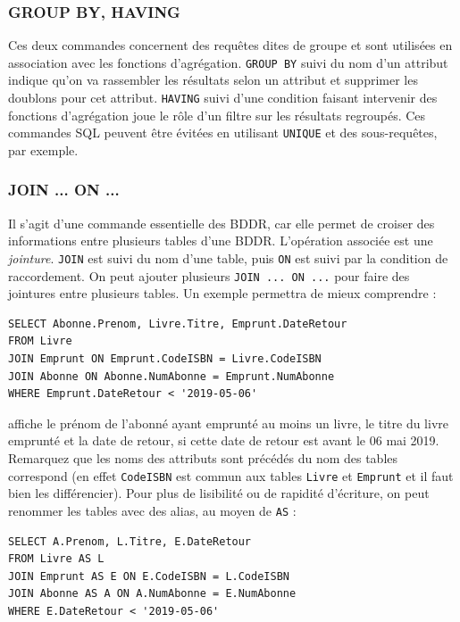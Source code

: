 \documentclass[french,11pt,twoside]{VcCours}
\begin{document}
\subsubsection*{GROUP BY, HAVING}

Ces deux commandes concernent des requêtes dites de groupe et sont utilisées en association avec les fonctions d'agrégation. \verb'GROUP BY' suivi du nom d'un attribut indique qu'on va rassembler les résultats selon un attribut et supprimer les doublons pour cet attribut. \verb'HAVING' suivi d'une condition faisant intervenir des fonctions d'agrégation joue le rôle d'un filtre sur les résultats regroupés. Ces commandes SQL peuvent être évitées en utilisant \verb'UNIQUE' et des sous-requêtes, par exemple.


\subsubsection*{JOIN ... ON ...}

Il s'agit d'une commande essentielle des BDDR, car elle permet de croiser des informations entre plusieurs tables d'une BDDR. L'opération associée est une \emph{jointure}. \verb'JOIN' est suivi du nom d'une table, puis \verb'ON' est suivi par la condition de raccordement. On peut ajouter plusieurs \verb'JOIN ... ON ...' pour faire des jointures entre plusieurs tables. Un exemple permettra de mieux comprendre : 
\begin{verbatim}
SELECT Abonne.Prenom, Livre.Titre, Emprunt.DateRetour 
FROM Livre 
JOIN Emprunt ON Emprunt.CodeISBN = Livre.CodeISBN
JOIN Abonne ON Abonne.NumAbonne = Emprunt.NumAbonne
WHERE Emprunt.DateRetour < '2019-05-06'
\end{verbatim}
affiche le prénom de l'abonné ayant emprunté au moins un livre, le titre du livre emprunté et la date de retour, si cette date de retour est avant le 06 mai 2019. Remarquez que les noms des attributs sont précédés du nom des tables correspond (en effet \verb'CodeISBN' est commun aux tables \verb'Livre' et \verb'Emprunt' et il faut bien les différencier). Pour plus de lisibilité ou de rapidité d'écriture, on peut renommer les tables avec des alias, au moyen de \verb'AS' : 
\begin{verbatim}
SELECT A.Prenom, L.Titre, E.DateRetour 
FROM Livre AS L
JOIN Emprunt AS E ON E.CodeISBN = L.CodeISBN
JOIN Abonne AS A ON A.NumAbonne = E.NumAbonne
WHERE E.DateRetour < '2019-05-06'
\end{verbatim}
\end{document}
